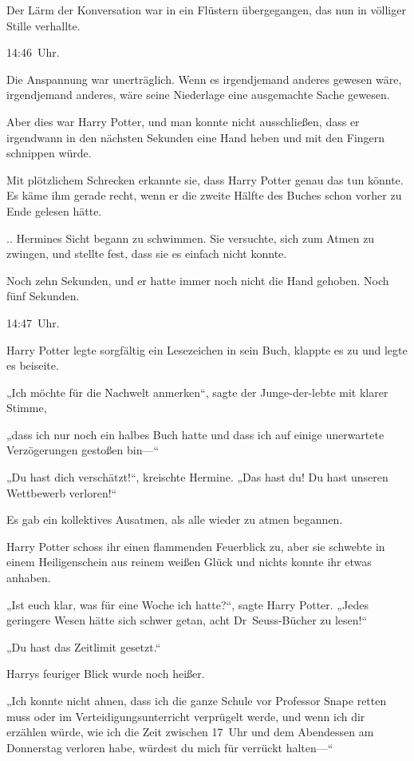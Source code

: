 {Der Lärm der Konversation war in ein Flüstern übergegangen, das nun in völliger Stille verhallte.

14:46~Uhr.

Die Anspannung war unerträglich. Wenn es irgendjemand anderes gewesen wäre, irgendjemand anderes, wäre seine Niederlage eine ausgemachte Sache gewesen.

Aber dies war Harry Potter, und man konnte nicht ausschließen, dass er irgendwann in den nächsten Sekunden eine Hand heben und mit den Fingern schnippen würde.

Mit plötzlichem Schrecken erkannte sie, dass Harry Potter genau das tun könnte. Es käme ihm gerade recht, wenn er die zweite Hälfte des Buches schon vorher zu Ende gelesen hätte.

.. Hermines Sicht begann zu schwimmen. Sie versuchte, sich zum Atmen zu zwingen, und stellte fest, dass sie es einfach nicht konnte.

Noch zehn Sekunden, und er hatte immer noch nicht die Hand gehoben. Noch fünf Sekunden.

14:47~Uhr.

Harry Potter legte sorgfältig ein Lesezeichen in sein Buch, klappte es zu und legte es beiseite.

„Ich möchte für die Nachwelt anmerken“, sagte der Junge-der-lebte mit klarer Stimme,

„dass ich nur noch ein halbes Buch hatte und dass ich auf einige unerwartete Verzögerungen gestoßen bin—“

„Du hast dich verschätzt!“, kreischte Hermine. „Das hast du! Du hast unseren Wettbewerb verloren!“

Es gab ein kollektives Ausatmen, als alle wieder zu atmen begannen.

Harry Potter schoss ihr einen flammenden Feuerblick zu, aber sie schwebte in einem Heiligenschein aus reinem weißen Glück und nichts konnte ihr etwas anhaben.

„Ist euch klar, was für eine Woche ich hatte?“, sagte Harry Potter. „Jedes geringere Wesen hätte sich schwer getan, acht Dr~Seuss-Bücher zu lesen!“

„Du hast das Zeitlimit gesetzt.“

Harrys feuriger Blick wurde noch heißer.

„Ich konnte nicht ahnen, dass ich die ganze Schule vor Professor Snape retten muss oder im Verteidigungsunterricht verprügelt werde, und wenn ich dir erzählen würde, wie ich die Zeit zwischen 17~Uhr und dem Abendessen am Donnerstag verloren habe, würdest du mich für verrückt halten—“

}
